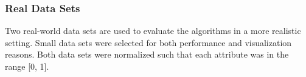 
\subsubsection{Real Data Sets}
Two real-world data sets are used to evaluate the algorithms in a more realistic setting. Small data sets were selected for both performance and visualization reasons. Both data sets were normalized such that each attribute was in the range [0, 1].

